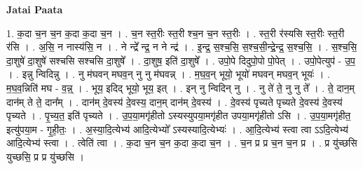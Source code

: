 \documentclass[17pt]{extarticle}
\begin{document}
\textbf{Jatai Paata} \newline

1. क॒दा च॒न च॒न क॒दा क॒दा च॒न । . च॒न स्त॒रीः स्त॒री श्च॒न च॒न स्त॒रीः । . स्त॒री र॑स्यसि स्त॒रीः स्त॒री र॑सि । . अ॒सि॒ न नास्य॑सि॒ न । . ने न्द्रे᳚ न्द्र॒ न ने न्द्र॑ । . इ॒न्द्र॒ स॒श्च॒सि॒ स॒श्च॒सी॒न्द्रे॒न्द्र॒ स॒श्च॒सि॒ । . स॒श्च॒सि॒ दा॒शुषे॑ दा॒शुषे॑ सश्चसि सश्चसि दा॒शुषे᳚ । . दा॒शुष॒ इति॑ दा॒शुषे᳚ । . उपो॒पे दिदुपो॒पो पो॒पेत् । . उपो॒पेत्युप॑ - उ॒प॒ । . इन्नु न्विदिन्नु । . नु म॑घवन् मघव॒न् नु नु म॑घवन्न् । . म॒घ॒व॒न् भूयो॒ भूयो॑ मघवन् मघव॒न् भूयः॑ । . म॒घ॒व॒न्निति॑ मघ - व॒न्न्॒ । . भूय॒ इदिद् भूयो॒ भूय॒ इत् । . इन् नु न्विदिन् नु । . नु ते॑ ते॒ नु नु ते᳚ । . ते॒ दान॒म् दान॑म् ते ते॒ दान᳚म् । . दान॑म् दे॒वस्य॑ दे॒वस्य॒ दान॒म् दान॑म् दे॒वस्य॑ । . दे॒वस्य॑ पृच्यते पृच्यते दे॒वस्य॑ दे॒वस्य॑ पृच्यते । . पृ॒च्य॒त॒ इति॑ पृच्यते । . उ॒प॒या॒मगृ॑हीतो ऽस्यस्युपया॒मगृ॑हीत उपया॒मगृ॑हीतो ऽसि । . उ॒प॒या॒मगृ॑हीत॒ इत्यु॑पया॒म - गृ॒ही॒तः॒ । . अ॒स्या॒दि॒त्येभ्य॑ आदि॒त्येभ्यो᳚ ऽस्यस्यादि॒त्येभ्यः॑ । . आ॒दि॒त्येभ्य॑ स्त्वा त्वा ऽऽदि॒त्येभ्य॑ आदि॒त्येभ्य॑ स्त्वा । . त्वेति॑ त्वा । . क॒दा च॒न च॒न क॒दा क॒दा च॒न । . च॒न प्र प्र च॒न च॒न प्र । . प्र यु॑च्छसि युच्छसि॒ प्र प्र यु॑च्छसि । \newline
\end{document}
